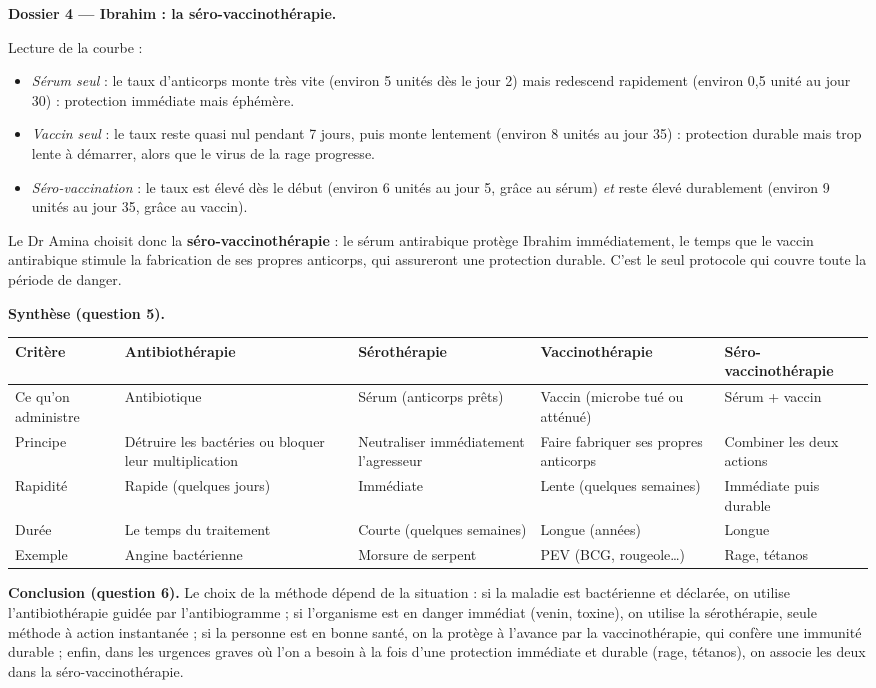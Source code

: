 \documentclass[11pt]{article}
\begin{document}
\begin{exoresolu}
\textbf{Dossier 4 — Ibrahim : la séro-vaccinothérapie.}

Lecture de la courbe :
\begin{itemize}
\item \emph{Sérum seul} : le taux d'anticorps monte très vite (environ 5 unités dès le jour 2) mais redescend rapidement (environ 0,5 unité au jour 30) : protection immédiate mais éphémère.
\item \emph{Vaccin seul} : le taux reste quasi nul pendant 7 jours, puis monte lentement (environ 8 unités au jour 35) : protection durable mais trop lente à démarrer, alors que le virus de la rage progresse.
\item \emph{Séro-vaccination} : le taux est élevé dès le début (environ 6 unités au jour 5, grâce au sérum) \emph{et} reste élevé durablement (environ 9 unités au jour 35, grâce au vaccin).
\end{itemize}
Le Dr Amina choisit donc la \textbf{séro-vaccinothérapie} : le sérum antirabique protège Ibrahim immédiatement, le temps que le vaccin antirabique stimule la fabrication de ses propres anticorps, qui assureront une protection durable. C'est le seul protocole qui couvre toute la période de danger.

\textbf{Synthèse (question 5).}

\begin{center}
\begin{tabularx}{\linewidth}{|l|X|X|X|X|}
\hline
\rowcolor{popblueL} Critère & Antibiothérapie & Sérothérapie & Vaccinothérapie & Séro-vaccinothérapie \\
\hline
Ce qu'on administre & Antibiotique & Sérum (anticorps prêts) & Vaccin (microbe tué ou atténué) & Sérum + vaccin \\
\hline
Principe & Détruire les bactéries ou bloquer leur multiplication & Neutraliser immédiatement l'agresseur & Faire fabriquer ses propres anticorps & Combiner les deux actions \\
\hline
Rapidité & Rapide (quelques jours) & Immédiate & Lente (quelques semaines) & Immédiate puis durable \\
\hline
Durée & Le temps du traitement & Courte (quelques semaines) & Longue (années) & Longue \\
\hline
Exemple & Angine bactérienne & Morsure de serpent & PEV (BCG, rougeole\ldots) & Rage, tétanos \\
\hline
\end{tabularx}
\end{center}

\textbf{Conclusion (question 6).} Le choix de la méthode dépend de la situation : si la maladie est bactérienne et déclarée, on utilise l'antibiothérapie guidée par l'antibiogramme ; si l'organisme est en danger immédiat (venin, toxine), on utilise la sérothérapie, seule méthode à action instantanée ; si la personne est en bonne santé, on la protège à l'avance par la vaccinothérapie, qui confère une immunité durable ; enfin, dans les urgences graves où l'on a besoin à la fois d'une protection immédiate et durable (rage, tétanos), on associe les deux dans la séro-vaccinothérapie.
\end{exoresolu}
\end{document}

